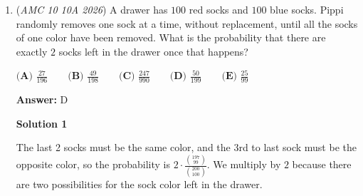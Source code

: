 \begin{enumerate}
 Furthermore, $n$ cannot contain any additional prime factor $p\ge7$, since
 \[n\ge240p\ge1680>999.\]

 Hence
 \[n=2^a3^b5^c,\]where $a\ge4$, $b\ge1$, and $c\ge1$.

 We now bound the exponents using $n\le999$.

 If $c\ge2$, then
 \[n\ge2^4\cdot3\cdot5^2=1200>999,\]so $c=1$.

 If $b\ge3$, then
 \[n\ge2^4\cdot3^3\cdot5=2160>999,\]so $b\in\{1,2\}$.

 If $a\ge7$, then
 \[n\ge2^7\cdot3\cdot5=1920>999,\]so $a\in\{4,5,6\}$.

 We now check the remaining possibilities:

 
            \begin{itemize}
        \item If $b=2$, only $a=4$ works, giving $n=2^4\cdot3^2\cdot5=720$.
        \item If $b=1$, then $a=5$ or $a=6$ gives $n=480$ or $n=960$. The case $a=4$ gives $n=240$, which is excluded because the six numbers are distinct.
            \end{itemize}
            Therefore, the possible values are $120$, $480$, $720$, and $960$.

 The required sum is
 \[\boxed{120+480+720+960=2280}.\]

 The answer is therefore $\boxed{\textbf{(D)}}$.

 ～ PeetahUndebrethale

 


	\item (\textit{AMC 10 10A 2026}) A drawer has $100$ red socks and $100$ blue socks. Pippi randomly removes one sock at a time, without replacement, until all the socks of one color have been removed. What is the probability that there are exactly $2$ socks left in the drawer once that happens?


 $\textbf{(A) } \frac{27}{196} \qquad\textbf{(B) } \frac{49}{198} \qquad\textbf{(C) } \frac{247}{990} \qquad\textbf{(D) } \frac{50}{199} \qquad\textbf{(E) } \frac{25}{99}$

 \textbf{Answer: }D



\textbf{Solution 1}

The last 2 socks must be the same color, and the 3rd to last sock must be the opposite color, so the probability is $2\cdot\frac{\binom{197}{99}}{\binom{200}{100}}$. We multiply by $2$ because there are two possibilities for the sock color left in the drawer. 


\end{enumerate}

